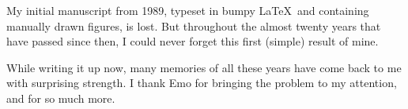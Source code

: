 \documentclass[fleqn,11pt]{article}
\begin{document}
My initial manuscript from 1989, typeset in bumpy \LaTeX\ and
containing manually drawn figures, is lost. But throughout the almost
twenty years that have passed since then, I could never forget this
first (simple) result of mine. 

While writing it up now, many memories of all these years have come
back to me with surprising strength. I thank Emo for bringing the
problem to my attention, and for so much more.
 
\end{document}
